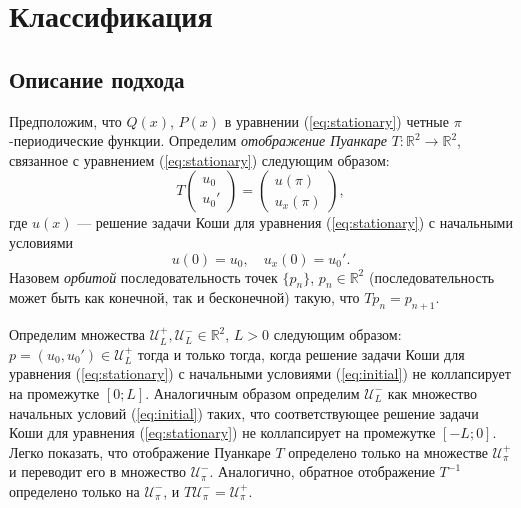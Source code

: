 \chapter{Классификация}

\section{Описание подхода}

Предположим, что $Q(x)$, $P(x)$ в уравнении (\ref{eq:stationary}) четные $\pi$-периодические функции.
Определим {\it отображение Пуанкаре} $T: \mathbb{R}^2 \to \mathbb{R}^2$, связанное с уравнением (\ref{eq:stationary}) следующим образом:
%
\begin{equation}
T
\begin{pmatrix}
u_0 \\
u_0'
\end{pmatrix}
=
\begin{pmatrix}
u(\pi) \\
u_x(\pi)
\end{pmatrix},
\end{equation}
%
где $u(x)$ --- решение задачи Коши для уравнения (\ref{eq:stationary}) с начальными условиями
%
\begin{equation}
u(0) = u_0, \quad u_x(0) = u_0'.
\label{eq:initial}
\end{equation}
%
Назовем {\it орбитой} последовательность точек $\{ p_n \}$, $p_n \in \mathbb{R}^2$ (последовательность может быть как конечной, так и бесконечной) такую, что $Tp_n = p_{n+1}$.

Определим множества $\mathcal{U}_L^+, \mathcal{U}_L^- \in \mathbb{R}^2$, $L > 0$ следующим образом: $p = (u_0, u_0') \in \mathcal{U}_L^+$ тогда и только тогда, когда решение задачи Коши для уравнения (\ref{eq:stationary}) с начальными условиями (\ref{eq:initial}) не коллапсирует на промежутке $[0;L]$.
Аналогичным образом определим $\mathcal{U}_L^-$ как множество начальных условий (\ref{eq:initial}) таких, что соответствующее решение задачи Коши для уравнения (\ref{eq:stationary}) не коллапсирует на промежутке $[-L;0]$.
Легко показать, что отображение Пуанкаре $T$ определено только на множестве $\mathcal{U}_{\pi}^+$ и переводит его в множество $\mathcal{U}_{\pi}^-$.
Аналогично, обратное отображение $T^{-1}$ определено только на $\mathcal{U}_{\pi}^-$, и $T \mathcal{U}_{\pi}^- = \mathcal{U}_{\pi}^+$.

